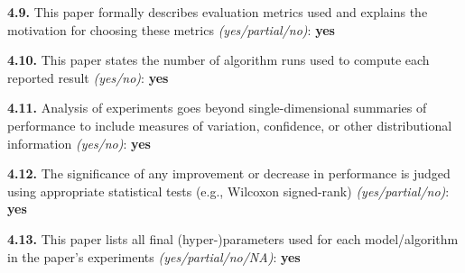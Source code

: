 \smallskip
\noindent\textbf{4.9.} This paper formally describes evaluation metrics used and explains the
motivation for choosing these metrics \textit{(yes/partial/no)}: \textbf{yes}

\smallskip
\noindent\textbf{4.10.} This paper states the number of algorithm runs used to compute each
reported result \textit{(yes/no)}: \textbf{yes}

\smallskip
\noindent\textbf{4.11.} Analysis of experiments goes beyond single-dimensional summaries of
performance to include measures of variation, confidence, or other distributional information
\textit{(yes/no)}: \textbf{yes}

\smallskip
\noindent\textbf{4.12.} The significance of any improvement or decrease in performance is
judged using appropriate statistical tests (e.g., Wilcoxon signed-rank)
\textit{(yes/partial/no)}: \textbf{yes}

\smallskip
\noindent\textbf{4.13.} This paper lists all final (hyper-)parameters used for each
model/algorithm in the paper's experiments \textit{(yes/partial/no/NA)}: \textbf{yes}
